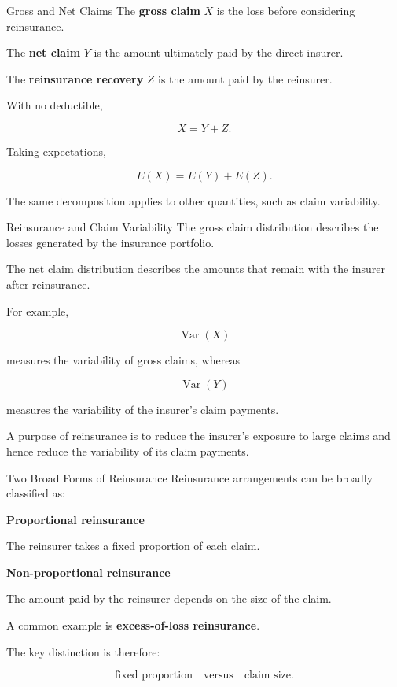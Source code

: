 \documentclass[
  ignorenonframetext,
  aspectratio=169,
]{beamer}
\begin{document}
\begin{frame}{Gross and Net Claims}
\protect{}\label{gross-and-net-claims}
The \textbf{gross claim} \(X\) is the loss before considering
reinsurance.

The \textbf{net claim} \(Y\) is the amount ultimately paid by the direct
insurer.

The \textbf{reinsurance recovery} \(Z\) is the amount paid by the
reinsurer.

With no deductible,

\[
X=Y+Z.
\]

Taking expectations,

\[
E(X)=E(Y)+E(Z).
\]

The same decomposition applies to other quantities, such as claim
variability.
\end{frame}

\begin{frame}{Reinsurance and Claim Variability}
\protect{}\label{reinsurance-and-claim-variability}
The gross claim distribution describes the losses generated by the
insurance portfolio.

The net claim distribution describes the amounts that remain with the
insurer after reinsurance.

For example,

\[
\operatorname{Var}(X)
\]

measures the variability of gross claims, whereas

\[
\operatorname{Var}(Y)
\]

measures the variability of the insurer's claim payments.

A purpose of reinsurance is to reduce the insurer's exposure to large
claims and hence reduce the variability of its claim payments.
\end{frame}

\begin{frame}{Two Broad Forms of Reinsurance}
\protect{}\label{two-broad-forms-of-reinsurance}
Reinsurance arrangements can be broadly classified as:

\textbf{Proportional reinsurance}

The reinsurer takes a fixed proportion of each claim.

\textbf{Non-proportional reinsurance}

The amount paid by the reinsurer depends on the size of the claim.

A common example is \textbf{excess-of-loss reinsurance}.

The key distinction is therefore:

\[
\text{fixed proportion}
\quad\text{versus}\quad
\text{claim size}.
\]
\end{frame}
\end{document}
